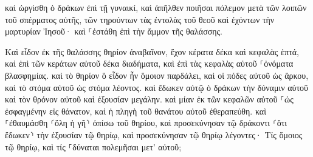 \documentclass{openreader}
\begin{document}
καὶ ὠργίσθη ὁ δράκων ἐπὶ τῇ γυναικί, καὶ ἀπῆλθεν ποιῆσαι πόλεμον μετὰ τῶν λοιπῶν τοῦ σπέρματος αὐτῆς, τῶν τηρούντων τὰς ἐντολὰς τοῦ θεοῦ καὶ ἐχόντων τὴν μαρτυρίαν Ἰησοῦ· 
καὶ ⸀ἐστάθη ἐπὶ τὴν ἄμμον τῆς θαλάσσης. 

Καὶ εἶδον ἐκ τῆς θαλάσσης θηρίον ἀναβαῖνον, ἔχον κέρατα δέκα καὶ κεφαλὰς ἑπτά, καὶ ἐπὶ τῶν κεράτων αὐτοῦ δέκα διαδήματα, καὶ ἐπὶ τὰς κεφαλὰς αὐτοῦ ⸀ὀνόματα βλασφημίας. 
καὶ τὸ θηρίον ὃ εἶδον ἦν ὅμοιον παρδάλει, καὶ οἱ πόδες αὐτοῦ ὡς ἄρκου, καὶ τὸ στόμα αὐτοῦ ὡς στόμα λέοντος. καὶ ἔδωκεν αὐτῷ ὁ δράκων τὴν δύναμιν αὐτοῦ καὶ τὸν θρόνον αὐτοῦ καὶ ἐξουσίαν μεγάλην. 
καὶ μίαν ἐκ τῶν κεφαλῶν αὐτοῦ ⸀ὡς ἐσφαγμένην εἰς θάνατον, καὶ ἡ πληγὴ τοῦ θανάτου αὐτοῦ ἐθεραπεύθη. καὶ ⸀ἐθαυμάσθη ⸂ὅλη ἡ γῆ⸃ ὀπίσω τοῦ θηρίου, 
καὶ προσεκύνησαν τῷ δράκοντι ⸂ὅτι ἔδωκεν⸃ τὴν ἐξουσίαν τῷ θηρίῳ, καὶ προσεκύνησαν τῷ θηρίῳ λέγοντες· Τίς ὅμοιος τῷ θηρίῳ, καὶ τίς ⸀δύναται πολεμῆσαι μετ’ αὐτοῦ; 
\end{document}
